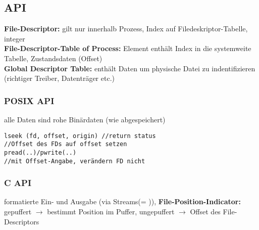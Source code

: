 \subsection{API}
\textbf{File-Descriptor:} gilt nur innerhalb Prozess, Index auf Filedeskriptor-Tabelle, integer\\
\textbf{File-Descriptor-Table of Process:} Element enthält Index in die systemweite Tabelle, Zustandsdaten (Offset) \\
\textbf{Global Descriptor Table:} enthält Daten um physische Datei zu indentifizieren (richtiger Treiber, Datenträger etc.)\\

\subsubsection{POSIX API}
alle Daten sind rohe Binärdaten (wie abgespeichert)
\begin{verbatim}
lseek (fd, offset, origin) //return status
//Offset des FDs auf offset setzen
pread(..)/pwrite(..)
//mit Offset-Angabe, verändern FD nicht
\end{verbatim}

\subsubsection{C API}
formatierte Ein- und Ausgabe (via Streams(= )),
\textbf{File-Position-Indicator:} gepuffert $\rightarrow$ bestimmt Position im Puffer, ungepuffert $\rightarrow$ Offset des File-Descriptors














